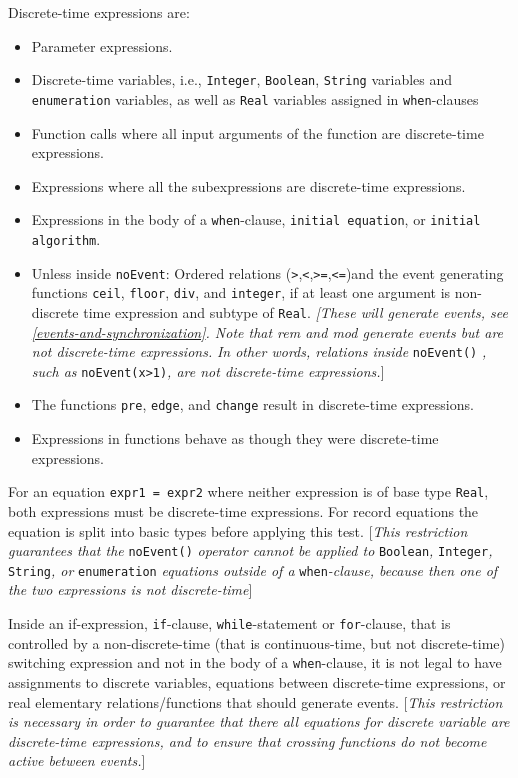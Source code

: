 Discrete-time expressions are:

\begin{itemize}
\item
  Parameter expressions.
\item
  Discrete-time variables, i.e., \lstinline!Integer!, \lstinline!Boolean!, \lstinline!String! variables and
  \lstinline!enumeration! variables, as well as \lstinline!Real! variables assigned in
  \lstinline!when!-clauses
\item
  Function calls where all input arguments of the function are
  discrete-time expressions.
\item
  Expressions where all the subexpressions are discrete-time
  expressions.
\item
  Expressions in the body of a \lstinline!when!-clause, \lstinline!initial equation!, or \lstinline!initial algorithm!.
\item
  Unless inside \lstinline!noEvent!: Ordered relations
  (\lstinline!>!,\lstinline!<!,\lstinline!>=!,\lstinline!<=!)and the event
  generating functions \lstinline!ceil!, \lstinline!floor!, \lstinline!div!, and \lstinline!integer!, if at least one
  argument is non-discrete time expression and subtype of \lstinline!Real!.
  \emph{{[}These will generate events, see \autoref{events-and-synchronization}. Note that
  rem and mod generate events but are not discrete-time expressions.}
  \emph{In other words, relations inside} \lstinline!noEvent()! \emph{, such as}
  \lstinline!noEvent(x>1)!\emph{, are not discrete-time
  expressions.}{]}
\item
  The functions \lstinline!pre!, \lstinline!edge!, and \lstinline!change! result in discrete-time
  expressions.
\item
  Expressions in functions behave as though they were discrete-time
  expressions.
\end{itemize}

For an equation \lstinline!expr1 = expr2! where neither expression is of base type
\lstinline!Real!, both expressions must be discrete-time expressions. For record
equations the equation is split into basic types before applying this
test. {[}\emph{This restriction guarantees that the} \lstinline!noEvent()!
\emph{operator cannot be applied to} \lstinline!Boolean!\emph{,} \lstinline!Integer!\emph{,}
\lstinline!String!\emph{, or} \lstinline!enumeration! \emph{equations outside of a} \lstinline!when!\emph{-clause, because
then one of the two expressions is not discrete-time}{]}

Inside an if-expression, \lstinline!if!-clause, \lstinline!while!-statement or \lstinline!for!-clause, that
is controlled by a non-discrete-time (that is continuous-time, but not
discrete-time) switching expression and not in the body of a
\lstinline!when!-clause, it is not legal to have assignments to discrete variables,
equations between discrete-time expressions, or real elementary
relations/functions that should generate events. {[}\emph{This
restriction is necessary in order to guarantee that there all equations
for discrete variable are discrete-time expressions, and to ensure that
crossing functions do not become active between events.}{]}\\

